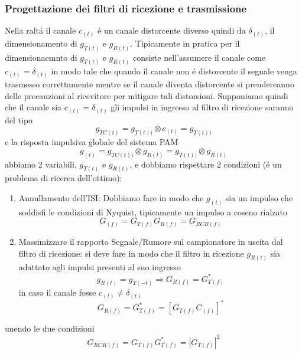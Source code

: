         \subsubsection{Progettazione dei filtri di ricezione e trasmissione}
            Nella raltá il canale $c_{(t)}$ é un canale distorcente diverso quindi da $\delta_{(t)}$, il dimensionamento di $g_{T(t)}$
            e $g_{R(t)}$. Tipicamente in pratica per il dimensionaemnto di $g_{T(t)}$ e $g_{R(t)}$ consiste nell'assumere il canale 
            come $c_{(t)} = \delta_{(t)}$ in modo tale che quando il canale non é distorcente il segnale venga trasmesso correttamente
            mentre se il canale diventa distorcente si prendereanno delle precauzioni al ricevitore per mitigare tali distorsioni.
            Supponiamo quindi che il canale sia $c_{(t)} = \delta_{(t)}$ gli impulsi in ingresso al filtro di ricezione saranno del tipo
            \[
                g_{TC(t)} = g_{T(t))} \otimes c_{(t)} =  g_{T(t))} 
            \]
            e la risposta impulsiva globale del sistema PAM
            \[
                g_{(t)} = g_{TC(t))} \otimes g_{R(t)} =  g_{T(t))} \otimes g_{R(t)}
            \]
            abbiamo 2 variabili, $g_{T(t)}$ e $g_{R(t)}$, e dobbiamo rispettare 2 condizioni (é un problema di ricerca dell'ottimo):
            \begin{enumerate}
                \item {
                    Annullamento dell'ISI: Dobbiamo fare in modo che $g_{(t)}$ sia un impulso che soddisfi le condizioni di Nyquist,
                    tipicamente un impulso a coseno rialzato
                    \[
                        G_{(f)} = G_{T(f)} G_{R(f)} = G_{RCR(f)} 
                    \]
                }
                \item {
                    Massimizzare il rapporto Segnale/Rumore sul campionatore in uscita dal filtro di ricezione:
                    si deve fare in modo che il filtro in ricezione $g_{R(t)}$ sia adattato agli impulsi presenti al suo ingresso
                    \[
                        g_{R(t)} = g_{T(-t)} \Rightarrow G_{R(f)} = G_{T(f)}^\ast
                    \]
                    in caso il canale fosse $c_{(t)} \neq \delta_{(t)}$ 
                    \[
                        G_{R(f)} = G_{T(f)}^\ast = \left[G_{T(f)} C_{(f)}\right]^\ast  
                    \]                
                }
            \end{enumerate}
            unendo le due condizioni 
            \[
                G_{RCR(f)} = G_{T(f)}G_{T(f)}^\ast = \left|G_{T(f)}\right|^2  
            \]
